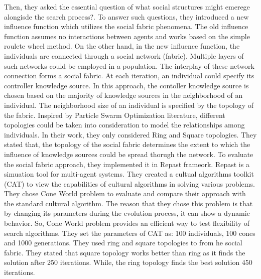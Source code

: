 Then, they asked the essential question of what social structures might emerege alongisde the search process?. To answer such questions, they introduced a new influence function which utilizes the social fabric phenomena. The old influence function assumes no interactions between agents and works based on the simple roulete wheel method. On the other hand, in the new influence function, the individuals are connected through a social network (fabric). Multiple layers of such networks could be employed in a population. The interplay of these network connection forms a social fabric. At each iteration, an individual could specify its controller knowledge source. In this approach, the contoller knowledge source is chosen based on the majority of knowledge sources in the neighborhood of an individual. The neighborhood size of an individual is specified by the topology of the fabric. Inspired by Particle Swarm Optimization literature, different topologies could be taken into consideration to model the relationships among individuals. In their work, they only considered Ring and Square topologies. They stated that, the topology of the social fabric determines the extent to which the influence of knowledge sources could be spread thorugh the network.\newline
To evaluate the social fabric approach, they implemented it in Repast frameork. Repast is a simuation tool for multi-agent systems. They created a cultual algorithms toolkit (CAT) to view the capabilities of cultural algorithms in solving various problems. They chose Cone World problem to evaluate and compare their approach with the standard cultural algorithm. The reason that they chose this problem is that by changing its parameters during the evolution process, it can show a dynamic behavior. So, Cone World problem provides an efficient way to test flexibility of search algorithms. They set the parameters of CAT as: 100 individuals, 100 cones and 1000 generations. They used ring and square topologies to from he social fabric. They stated that square topology works better than ring as it finds the solution after 250 iterations. While, the ring topology finds the best solution 450 iterations.
